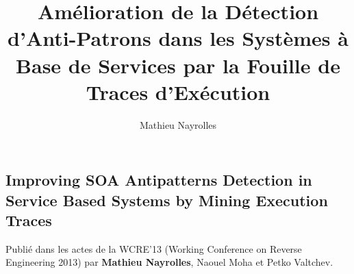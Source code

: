 \documentclass[12pt]{memoireuqam1.3}
\begin{document}
\title{Am\'elioration de la D\'etection d'Anti-Patrons dans les Syst\`emes \`a Base de Services par la Fouille de Traces d'Ex\'ecution}
\author{Mathieu Nayrolles}
{}
\uqammemoire %
{}


\thispagestyle{empty}        %
\maketitle

\renewcommand \bibname{R\'EF\'ERENCES}%

\renewcommand \listfigurename{LISTE DES FIGURES}
\renewcommand \appendixname{APPENDICE}
\renewcommand \figurename{Figure}
\renewcommand \tablename{Tableau}

\addtocounter{page}{1} %

\tableofcontents %
\listoftables %
\listoffigures %













\begin{appendices} 
\chapter{Improving SOA Antipatterns Detection in Service Based Systems by Mining Execution Traces} 

Publi\'e dans les actes de la WCRE'13 (Working Conference on Reverse Engineering 2013) par \textbf{Mathieu Nayrolles}, Naouel Moha et Petko Valtchev.
\newpage


\end{appendices}



\end{document}
